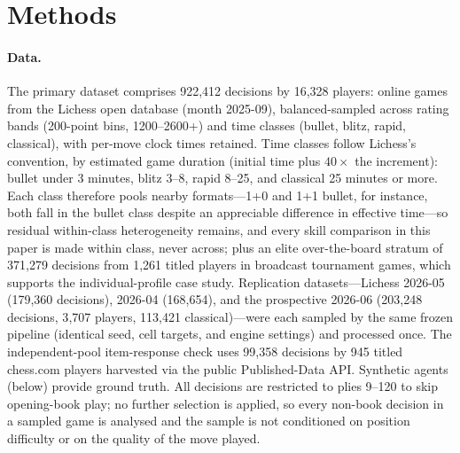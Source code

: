 \section{Methods}
\paragraph{Data.}
The primary dataset comprises 922{,}412 decisions by 16{,}328 players: online games from the
Lichess open database (month 2025-09), balanced-sampled across rating bands (200-point bins,
1200--2600+) and time classes (bullet, blitz, rapid, classical), with per-move clock times
retained.
Time classes follow Lichess's convention, by estimated game duration (initial time
plus $40\times$ the increment): bullet under 3 minutes, blitz 3--8, rapid 8--25, and
classical 25 minutes or more. Each class therefore pools nearby formats---1+0 and 1+1 bullet,
for instance, both fall in the bullet class despite an appreciable difference in effective
time---so residual within-class heterogeneity remains, and every skill comparison in this
paper is made within class, never across; plus an elite over-the-board stratum of 371{,}279 decisions from 1{,}261 titled
players in broadcast tournament games, which supports the individual-profile case study.
Replication datasets---Lichess 2026-05 (179{,}360 decisions), 2026-04 (168{,}654), and the
prospective 2026-06 (203{,}248 decisions, 3{,}707 players, 113{,}421 classical)---were each
sampled by the same frozen pipeline (identical seed, cell targets, and engine settings) and
processed once. The independent-pool item-response check uses 99{,}358 decisions by 945
titled chess.com players harvested via the public Published-Data API. Synthetic agents
(below) provide ground truth. All decisions are restricted to plies 9--120 to skip
opening-book play; no further selection is applied, so every non-book decision in a sampled
game is analysed and the sample is not conditioned on position difficulty or on the quality of
the move played.

